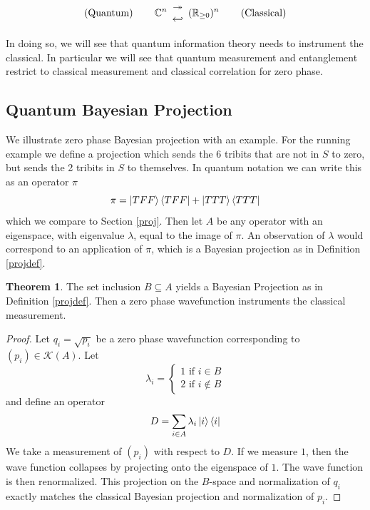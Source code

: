 \documentclass[12pt,a4paper]{article}
\theoremstyle{myrule}
\theoremstyle{postulate}
\theoremstyle{definition}
\newtheorem{theorem}{Theorem}[section]
\begin{document}
{
\renewcommand{\arraystretch}{0.1}
\[
\text{(Quantum)} \hspace{0.3 in}
\mathbb{C}^n \begin{array}{c} \twoheadrightarrow \\ \hookleftarrow \end{array}
(\mathbb{R}_{\ge 0})^n
\hspace{0.3 in} \text{(Classical)} 
\]
}

In doing so, we will see that quantum information theory needs to instrument the classical.  In particular we will see that quantum measurement and entanglement restrict to classical measurement and classical correlation for zero phase.

\subsection{Quantum Bayesian Projection}
We illustrate zero phase Bayesian projection with an example.  For the running example we define a projection which sends the 6 tribits that are not in $S$ to zero, but sends the 2 tribits in $S$ to themselves.  In quantum notation we can write this as an operator $\pi$ 
\[
\pi = \ket{TFF} \bra{TFF} + \ket{TTT} \bra{TTT}
\]
which we compare to Section \ref{proj}.  Then let $A$ be any operator with an eigenspace, with eigenvalue $\lambda$, equal to the image of $\pi$.  An observation of $\lambda$ would correspond to an application of $\pi$, which is a Bayesian projection as in Definition \ref{projdef}.
\begin{theorem}
  The set inclusion $B \subseteq A$ yields a Bayesian Projection as in Definition \ref{projdef}.  Then a zero phase wavefunction instruments the classical measurement.
\end{theorem}
\begin{proof}
Let $q_i = \sqrt{p_i}$ be a zero phase wavefunction corresponding to $(p_i) \in \mathcal{K}(A)$.  Let
  \[
  \lambda_i = \left\{ \begin{array}{ll} 1 \text{ if } i \in B \\ 2 \text{ if } i \not \in B \end{array} \right.
  \]
and define an operator
\[
  D = \sum_{i \in A} \lambda_i \ket{i} \bra{i}
\]
We take a measurement of $(p_i)$ with respect to $D$. If we measure $1$, then the wave function collapses by projecting onto the eigenspace of $1$. The wave function is then renormalized.  This projection on the $B$-space and normalization of $q_i$ exactly matches the classical Bayesian projection and normalization of $p_i$.
\end{proof}
\end{document}
